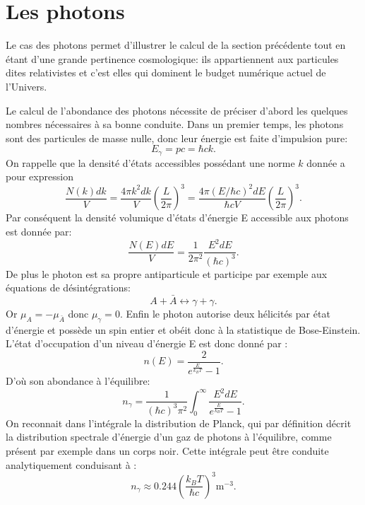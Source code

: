 \section{Les photons}
Le cas des photons permet d'illustrer le calcul de la section précédente tout en étant d'une grande pertinence cosmologique: ils appartiennent aux particules dites relativistes et c'est elles qui dominent le budget numérique actuel de l'Univers. 

Le calcul de l'abondance des photons nécessite de préciser d'abord les quelques nombres nécessaires à sa bonne conduite. Dans un premier temps, les photons sont des particules de masse nulle, donc leur énergie est faite d'impulsion pure:
\begin{equation}
E_\gamma=pc=\hbar c k.
\end{equation} 
On rappelle que la densité d'états accessibles possédant une norme $k$ donnée a pour expression 
\begin{equation}
\frac{N(k)dk}{V}=\frac{4\pi k^2 dk}{V}\left(\frac{L}{2\pi}\right)^3=\frac{4\pi (E/\hbar c)^2 dE}{\hbar c V}\left(\frac{L}{2\pi}\right)^3.
\end{equation}
Par conséquent la densité volumique d'états d'énergie E accessible aux photons est donnée par:
\begin{equation}
\frac{N(E)dE}{V}=\frac{1}{2\pi^2}\frac{E^2dE}{(\hbar c)^3}.
\end{equation}
De plus le photon est sa propre antiparticule et participe par exemple aux équations de désintégrations:
\begin{equation}
A + \bar{A} \leftrightarrow \gamma+\gamma.
\end{equation}
Or $\mu_A=-\mu_{\bar{A}}$ donc $\mu_\gamma=0$. Enfin le photon autorise deux hélicités par état d'énergie et possède un spin entier et obéit donc à la statistique de Bose-Einstein. L'état d'occupation d'un niveau d'énergie E est donc donné par :
\begin{equation}
n(E)=\frac{2}{e^{\frac{E}{k_B T}}-1}.
\end{equation}
D'où son abondance à l'équilibre:
\begin{equation}
n_\gamma=\frac{1}{(\hbar c)^3\pi^2}\int_0^\infty\frac{E^2dE}{e^{\frac{E}{k_B T}}-1}.
\end{equation}
On reconnait dans l'intégrale la distribution de Planck, qui par définition décrit la distribution spectrale d'énergie d'un gaz de photons à l'équilibre, comme présent par exemple dans un corps noir. Cette intégrale peut être conduite analytiquement conduisant à  :
\begin{equation}
n_\gamma \approx 0.244 \left(\frac{k_BT}{\hbar c}\right)^3 \mathrm{m}^{-3}.
\label{e:densphot}
\end{equation}

